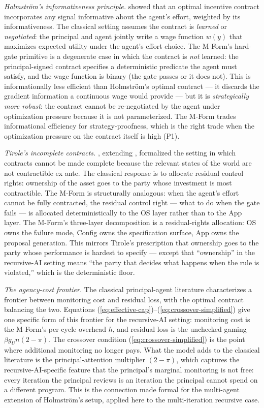 \documentclass[11pt]{article}
\begin{document}
\emph{Holmstr\"om's informativeness principle.} \citet{holmstrom1979} showed that an optimal incentive contract incorporates any signal informative about the agent's effort, weighted by its informativeness. The classical setting assumes the contract is \emph{learned} or \emph{negotiated}: the principal and agent jointly write a wage function $w(y)$ that maximizes expected utility under the agent's effort choice. The M-Form's hard-gate primitive is a degenerate case in which the contract is \emph{not} learned: the principal-signed contract specifies a deterministic predicate the agent must satisfy, and the wage function is binary (the gate passes or it does not). This is informationally less efficient than Holmstr\"om's optimal contract --- it discards the gradient information a continuous wage would provide --- but it is \emph{strategically more robust}: the contract cannot be re-negotiated by the agent under optimization pressure because it is not parameterized. The M-Form trades informational efficiency for strategy-proofness, which is the right trade when the optimization pressure on the contract itself is high (P1).

\emph{Tirole's incomplete contracts.} \citet{tirole1999}, extending \citet{grossman1986}, formalized the setting in which contracts cannot be made complete because the relevant states of the world are not contractible ex ante. The classical response is to allocate residual control rights: ownership of the asset goes to the party whose investment is most contractible. The M-Form is structurally analogous: when the agent's effort cannot be fully contracted, the residual control right --- what to do when the gate fails --- is allocated deterministically to the OS layer rather than to the App layer. The M-Form's three-layer decomposition is a residual-rights allocation: OS owns the failure mode, Config owns the specification surface, App owns the proposal generation. This mirrors Tirole's prescription that ownership goes to the party whose performance is hardest to specify --- except that ``ownership'' in the recursive-AI setting means ``the party that decides what happens when the rule is violated,'' which is the deterministic floor.

\emph{The agency-cost frontier.} The classical principal-agent literature characterizes a frontier between monitoring cost and residual loss, with the optimal contract balancing the two. Equations (\ref{eq:effective-cap})--(\ref{eq:crossover-simplified}) give one specific form of this frontier for the recursive-AI setting: monitoring cost is the M-Form's per-cycle overhead $h$, and residual loss is the unchecked gaming $\beta g_U n (2 - \pi)$. The crossover condition (\ref{eq:crossover-simplified}) is the point where additional monitoring no longer pays. What the model adds to the classical literature is the principal-attention multiplier $(2 - \pi)$, which captures the recursive-AI-specific feature that the principal's marginal monitoring is not free: every iteration the principal reviews is an iteration the principal cannot spend on a different program. This is the connection \citet{laffont2002} made formal for the multi-agent extension of Holmstr\"om's setup, applied here to the multi-iteration recursive case.
\end{document}
